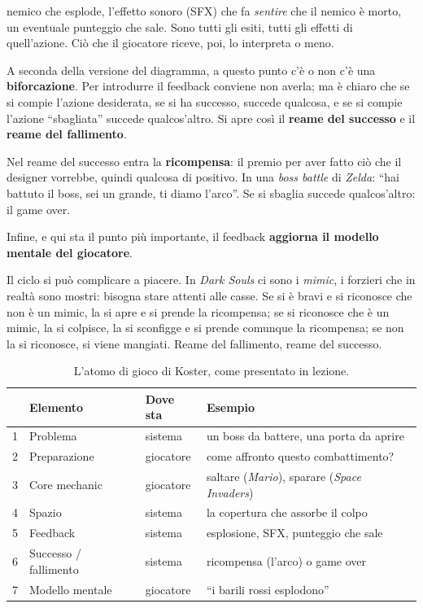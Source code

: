 \begin{description}
        nemico che esplode, l'effetto sonoro (SFX) che fa \emph{sentire} che
        il nemico è morto, un eventuale punteggio che sale. Sono tutti gli
        esiti, tutti gli effetti di quell'azione. Ciò che il giocatore riceve,
        poi, lo interpreta o meno.
  \item[Successo e fallimento] A seconda della versione del diagramma, a
        questo punto c'è o non c'è una \textbf{biforcazione}. Per introdurre
        il feedback conviene non averla; ma è chiaro che se si compie
        l'azione desiderata, se si ha successo, succede qualcosa, e se si
        compie l'azione ``sbagliata'' succede qualcos'altro. Si apre così il
        \textbf{reame del successo} e il \textbf{reame del fallimento}.
  \item[Ricompensa] Nel reame del successo entra la \textbf{ricompensa}: il
        premio per aver fatto ciò che il designer vorrebbe, quindi qualcosa di
        positivo. In una \emph{boss battle} di \emph{Zelda}: ``hai battuto il
        boss, sei un grande, ti diamo l'arco''. Se si sbaglia succede
        qualcos'altro: il game over.
  \item[Modello mentale] Infine, e qui sta il punto più importante, il
        feedback \textbf{aggiorna il modello mentale del giocatore}.
\end{description}

Il ciclo si può complicare a piacere. In \emph{Dark Souls} ci sono i
\emph{mimic}, i forzieri che in realtà sono mostri: bisogna stare attenti alle
casse. Se si è bravi e si riconosce che non è un mimic, la si apre e si prende
la ricompensa; se si riconosce che è un mimic, la si colpisce, la si sconfigge
e si prende comunque la ricompensa; se non la si riconosce, si viene mangiati.
Reame del fallimento, reame del successo.

\begin{table}[htbp]
  \centering
  \caption{L'atomo di gioco di Koster, come presentato in lezione.}
  \label{tab:atomo-koster}
  \begin{tabular}{@{}p{}p{}p{}p{}@{}}
    \toprule
    & \textbf{Elemento} & \textbf{Dove sta} & \textbf{Esempio} \\
    \midrule
    1 & Problema & sistema & un boss da battere, una porta da aprire \\
    2 & Preparazione & giocatore & come affronto questo combattimento? \\
    3 & Core mechanic & giocatore & saltare (\emph{Mario}), sparare (\emph{Space Invaders}) \\
    4 & Spazio & sistema & la copertura che assorbe il colpo \\
    5 & Feedback & sistema & esplosione, SFX, punteggio che sale \\
    6 & Successo / fallimento & sistema & ricompensa (l'arco) o game over \\
    7 & Modello mentale & giocatore & ``i barili rossi esplodono'' \\
    \bottomrule
  \end{tabular}
\end{table}

